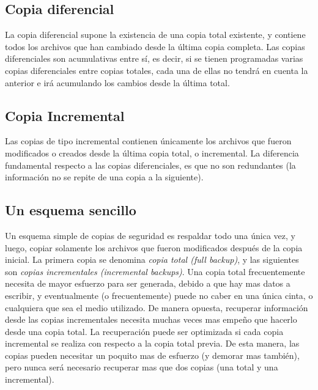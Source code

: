 \documentclass[12pt]{article}
\begin{document}
\subsection*{Copia diferencial}
La copia diferencial supone la existencia de una copia total existente, y
contiene todos los archivos que han cambiado desde la última
copia completa. Las copias diferenciales son acumulativas entre sí, es 
decir, si se tienen programadas varias copias diferenciales entre copias
 totales, cada una de ellas no tendrá en cuenta la anterior e irá 
acumulando los cambios desde la última total.

\subsection*{Copia Incremental}
Las copias de tipo incremental contienen únicamente los archivos que fueron
modificados o creados desde la última copia total, o incremental. La 
diferencia fundamental respecto a las copias diferenciales, es que no son 
redundantes (la información no se repite de una copia a la siguiente).

\subsection*{Un esquema sencillo}

Un esquema simple de copias de seguridad es respaldar todo una única vez, 
y luego, copiar solamente los archivos que fueron modificados después de 
la copia inicial. La primera copia se denomina \textit{copia total (full 
backup)}, y las siguientes son \textit{copias incrementales 
(incremental backups)}. Una copia total frecuentemente necesita de mayor 
esfuerzo para ser generada, debido a que hay mas datos a escribir,
y eventualmente (o frecuentemente) puede no caber en una única cinta, o 
cualquiera que sea el medio utilizado.
De manera opuesta, recuperar información desde las copias
incrementales necesita muchas veces mas empeño que hacerlo desde una copia 
total. La recuperación puede ser optimizada si cada copia incremental se 
realiza con respecto a la copia total previa. De esta manera, las copias 
pueden necesitar un poquito mas de esfuerzo (y demorar mas también), 
pero nunca será necesario recuperar mas que dos copias (una total y una 
incremental).
\end{document}
